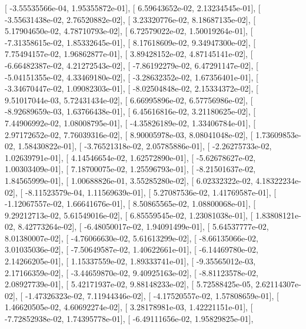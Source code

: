 \documentclass{article}
\begin{document}
       [ -3.55535566e-04,   1.95355872e-01],
       [  6.59643652e-02,   2.13234545e-01],
       [ -3.55631438e-02,   2.76520882e-02],
       [  3.23320776e-02,   8.18687135e-02],
       [  5.17904650e-02,   4.78710793e-02],
       [  6.72579022e-02,   1.50019264e-01],
       [ -7.31358615e-02,   1.85332645e-01],
       [  8.17618609e-02,   9.34947300e-02],
       [  7.75494157e-02,   1.96862877e-01],
       [  3.89428152e-02,   4.87145141e-02],
       [ -6.66482387e-02,   4.21272543e-02],
       [ -7.86192279e-02,   6.47291147e-02],
       [ -5.04151355e-02,   4.33469180e-02],
       [ -3.28632352e-02,   1.67356401e-01],
       [ -3.34670447e-02,   1.09082303e-01],
       [ -8.02504848e-02,   2.15334372e-02],
       [  9.51017044e-03,   5.72431434e-02],
       [  6.66995896e-02,   6.57756986e-02],
       [ -8.92689659e-03,   1.63766438e-01],
       [  6.45616816e-02,   3.21180625e-02],
       [  7.44906992e-02,   1.08008795e-01],
       [ -4.35826189e-02,   1.33406784e-01],
       [  2.97172652e-02,   7.76039316e-02],
       [  8.90005978e-03,   8.08041048e-02],
       [  1.73609853e-02,   1.58430822e-01],
       [ -3.76521318e-02,   2.05785886e-01],
       [ -2.26275733e-02,   1.02639791e-01],
       [  4.14546654e-02,   1.62572890e-01],
       [ -5.62678627e-02,   1.00303409e-01],
       [  7.18700075e-02,   1.25596793e-01],
       [ -8.21501637e-02,   1.84565999e-01],
       [  1.00688826e-01,   3.55285280e-02],
       [  6.02332322e-02,   4.18322234e-02],
       [ -8.11523579e-04,   1.11569639e-01],
       [  5.27087536e-02,   1.41769587e-01],
       [ -1.12067557e-02,   1.66641676e-01],
       [  8.50865565e-02,   1.08800068e-01],
       [  9.29212713e-02,   5.61549016e-02],
       [  6.85559545e-02,   1.23081038e-01],
       [  1.83808121e-02,   8.42773264e-02],
       [ -6.48050017e-02,   1.94091499e-01],
       [  5.64537777e-02,   8.01380007e-02],
       [ -4.76066630e-02,   5.61613299e-02],
       [ -8.66135066e-02,   3.01035036e-02],
       [ -7.50649587e-02,   1.40622661e-01],
       [ -6.14469780e-02,   2.14266205e-01],
       [  1.15337559e-02,   1.89333741e-01],
       [ -9.35565012e-03,   2.17166359e-02],
       [ -3.44659870e-02,   9.40925163e-02],
       [ -8.81123578e-02,   2.08927739e-01],
       [  5.42171937e-02,   9.88148233e-02],
       [  5.72588425e-05,   2.62114307e-02],
       [ -1.47326323e-02,   7.11944346e-02],
       [ -4.17520557e-02,   1.57808659e-01],
       [  1.46620505e-02,   4.60692274e-02],
       [  3.28178981e-03,   1.42221151e-01],
       [ -7.72852938e-02,   1.74395778e-01],
       [ -6.49111656e-02,   1.95829825e-01],
\end{document}
